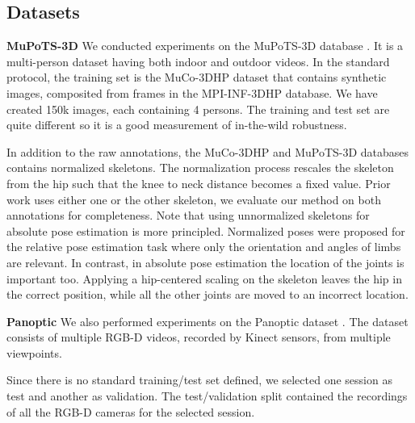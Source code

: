 \documentclass[runningheads]{llncs}
\begin{document}
\subsection{Datasets} \label{sec:datasets}

\textbf{MuPoTS-3D} We conducted experiments on the MuPoTS-3D database \cite{mehta2018single_shot}. It is a multi-person dataset having both indoor and outdoor videos. In the standard protocol, the training set is the MuCo-3DHP dataset \cite{mehta2018single_shot} that contains synthetic images, composited from frames in the MPI-INF-3DHP \cite{mehta} database. We have created 150k images, each containing 4 persons. The training and test set are quite different so it is a good measurement of in-the-wild robustness.

In addition to the raw annotations, the MuCo-3DHP and MuPoTS-3D databases contains normalized skeletons. The normalization process rescales the skeleton from the hip such that the knee to neck distance becomes a fixed value. Prior work uses either one or the other skeleton, we evaluate our method on both annotations for completeness. Note that using unnormalized skeletons for absolute pose estimation is more principled. Normalized poses were proposed for the relative pose estimation task where only the orientation and angles of limbs are relevant. In contrast, in absolute pose estimation the location of the joints is important too. Applying a hip-centered scaling on the skeleton leaves the hip in the correct position, while all the other joints are moved to an incorrect location.

\textbf{Panoptic} We also performed experiments on the Panoptic dataset \cite{panoptic}. The dataset consists of multiple RGB\nobreakdash-D videos, recorded by Kinect sensors, from multiple viewpoints.

Since there is no standard training/test set defined, we selected one session as test and another as validation. The test/validation split contained the recordings of all the RGB-D cameras for the selected session.
\end{document}
